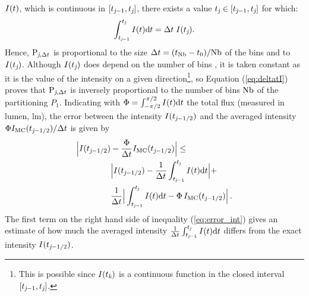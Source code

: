 $I(t)$, which is continuous in $[t_{\textit{j}-1}, t_{\textit{j}}]$, there exists a value $t_{\textit{j}}\in[t_{\textit{j}-1}, t_{\textit{j}}]$ for which:
 \begin{equation}\label{eq:deltatI}
\int_{t_{\textit{j}-1}}^{t_{\textit{j}}} I(t) \textrm{d}t = \Delta t\;I(t_{\textit{j}}).
\end{equation}
Hence, $\textrm{P}_{\textit{j}, \Delta t}$ is proportional to the size $\Delta t= (t_{\textrm{Nb}}-t_{0})/{\textrm{Nb}}$
of the bins and to $I(t_{\textit{j}})$. Although $I(t_{\textit{j}})$ does depend on the number of bins \nbin, it is taken constant as it is the value of the intensity on a given direction\footnote{This is possible since $I(t_{\textit{k}})$ is a continuous function in the closed interval $[t_{\textit{j}-1}, t_{\textit{j}}]$.}, so Equation (\ref{eq:deltatI}) proves that $\textrm{P}_{\textit{j}, \Delta t}$ is inversely proportional to the number of bins $\textrm{Nb}$ of the partitioning $P_1$.
Indicating with $\Phi = \int_{-\pi/2}^{\pi/2}I(t) \textrm{d}t$ the total flux (measured in lumen, $\textrm{lm}$),
the error between the intensity $I(t_{\textit{j}-1/2})$
 and the averaged  intensity $\Phi I_{\textrm{MC}}(t_{\textit{j}-1/2})/\Delta t$ is given by
\begin{equation}\label{eq:error_int}
\begin{aligned}
\Big|I(t_{\textit{j}-1/2})&-\frac{\Phi}
{\Delta t}I_{\textrm{MC}}(t_{\textit{j}-1/2})\Big| \leq\\
 &\Big|I(t_{\textit{j}-1/2})-\frac{1}{\Delta t}\int_{t_{\textit{j}-1}}^{t_{\textit{j}}} I(t)\textrm{d}t\Big|+\\
&\frac{1}{\Delta t}\Big|\int_{t_{\textit{j}-1}}^{t_{\textit{j}}} I(t)\textrm{d}t-
\Phi\, I_{\textrm{MC}}(t_{\textit{j}-1/2})\Big| \,.
\end{aligned}
\end{equation}
\indent The first term on the right hand side of inequality (\ref{eq:error_int}) gives an estimate of how much the averaged intensity
 $\frac{1}{\Delta t}\int_{t_{\textit{j}-1}}^{t_{\textit{j}}} I(t)\textrm{d}t$ differs from the exact intensity $I(t_{\textit{j}-1/2})$.
